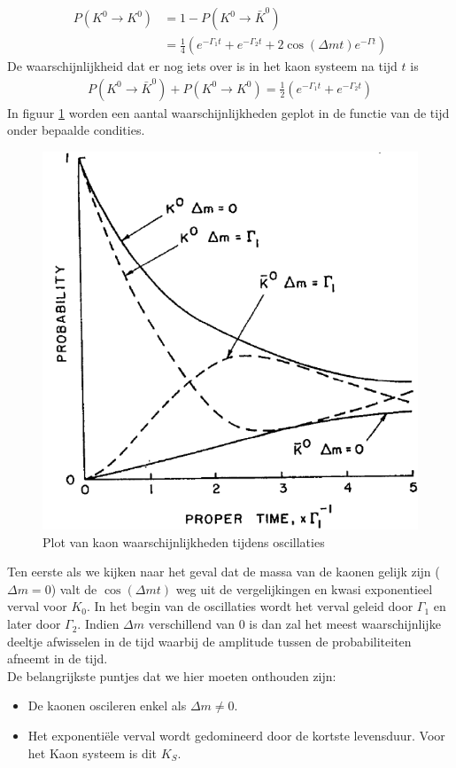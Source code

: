 \documentclass[../main.tex]{subfiles}
\begin{document}
\begin{equation}
    \begin{aligned}
        \label{eq:voorbeeld_kaon_osc_tijd_prop_4}
        P\left(K^{0} \rightarrow K^{0}\right) &= 1-P\left(K^{0} \rightarrow \bar{K}^{0}\right)\\
                                              &=\frac{1}{4}\left(e^{-\Gamma_{1} t}+e^{-\Gamma_{2} t}+2 \cos (\Delta m t) e^{-\Gamma t}\right)
    \end{aligned}
\end{equation}
De waarschijnlijkheid dat er nog iets over is in het kaon systeem na tijd $t$ is
\begin{equation}
    \begin{aligned}
        \label{eq:voorbeeld_kaon_osc_tijd_prop_5}
        P\left(K^{0} \rightarrow \bar{K}^{0}\right)+P\left(K^{0} \rightarrow K^{0}\right)=\frac{1}{2}\left(e^{-\Gamma_{1} t}+e^{-\Gamma_{2} t}\right)
    \end{aligned}
\end{equation}
In figuur \ref{fig:meson_mixing_and_oscillations/kaon_osc_tijd_plot} worden een aantal waarschijnlijkheden geplot in de functie van de tijd onder bepaalde condities.

\begin{figure}[h]
    \centering
    \includegraphics[width=0.5\linewidth]{meson_mixing_and_oscillations/kaon_osc_tijd_plot.png}
    \caption{Plot van kaon waarschijnlijkheden tijdens oscillaties}%
    \label{fig:meson_mixing_and_oscillations/kaon_osc_tijd_plot}
\end{figure}

Ten eerste als we kijken naar het geval dat de massa van de kaonen gelijk zijn ($\Delta m = 0$) valt de $\cos(\Delta m t)$ weg uit de vergelijkingen en kwasi exponentieel verval voor $K_0$. In het begin van de oscillaties wordt het verval geleid door $\Gamma_1$ en later door $\Gamma_2$. Indien $\Delta m$ verschillend van 0 is dan zal het meest waarschijnlijke deeltje afwisselen in de tijd waarbij de amplitude tussen de probabiliteiten afneemt in de tijd.\\
De belangrijkste puntjes dat we hier moeten onthouden zijn:
\begin{itemize}
    \item De kaonen oscileren enkel als $\Delta m \neq 0$.
    \item Het exponentiële verval wordt gedomineerd door de kortste levensduur. Voor het Kaon systeem is dit $K_S$.
\end{itemize}
\end{document}
